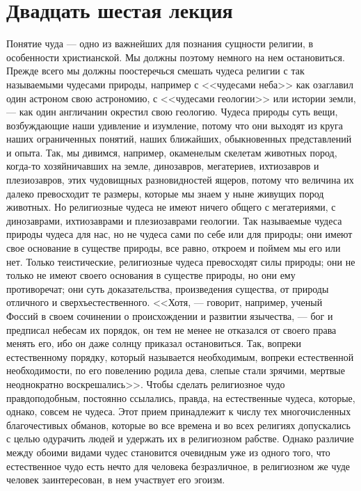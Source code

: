 \documentclass[12pt]{article}
\begin{document}
\section*{Двадцать шестая лекция}

Понятие чуда --- одно из важнейших для познания сущности религии, в особенности христианской. Мы должны поэтому немного на нем остановиться. Прежде всего мы должны поостеречься смешать чудеса религии с так называемыми чудесами природы, например с <<чудесами неба>>  как озаглавил один астроном свою астрономию, с <<чудесами геологии>>  или истории земли, --- как один англичанин окрестил свою геологию. Чудеса природы суть вещи, возбуждающие наши удивление и изумление, потому что они выходят из круга наших ограниченных понятий, наших ближайших, обыкновенных представлений и опыта. Так, мы дивимся, например, окаменелым скелетам животных пород, когда-то хозяйничавших на земле, динозавров, мегатериев, ихтиозавров и плезиозавров, этих чудовищных разновидностей ящеров, потому что величина их далеко превосходит те размеры, которые мы знаем у ныне живущих пород животных. Но религиозные чудеса не имеют ничего общего с мегатериями, с динозаврами, ихтиозаврами и плезиозаврами геологии. Так называемые чудеса природы чудеса для нас, но не чудеса сами по себе или для природы; они имеют свое основание в существе природы, все равно, откроем и поймем мы его или нет. Только теистические, религиозные чудеса превосходят силы природы; они не только не имеют своего основания в существе природы, но они ему противоречат; они суть доказательства, произведения существа, от природы отличного и сверхъестественного. <<Хотя, --- говорит, например, ученый Фоссий в своем сочинении о происхождении и развитии язычества, --- бог и предписал небесам их порядок, он тем не менее не отказался от своего права менять его, ибо он даже солнцу приказал остановиться. Так, вопреки естественному порядку, который называется необходимым, вопреки естественной необходимости, по его повелению родила дева, слепые стали зрячими, мертвые неоднократно воскрешались>>. Чтобы сделать религиозное чудо правдоподобным, постоянно ссылались, правда, на естественные чудеса, которые, однако, совсем не чудеса. Этот прием принадлежит к числу тех многочисленных благочестивых обманов, которые во все времена и во всех религиях допускались с целью одурачить людей и удержать их в религиозном рабстве. Однако различие между обоими видами чудес становится очевидным уже из одного того, что естественное чудо есть нечто для человека безразличное, в религиозном же чуде человек заинтересован, в нем участвует его эгоизм. 
\end{document}
